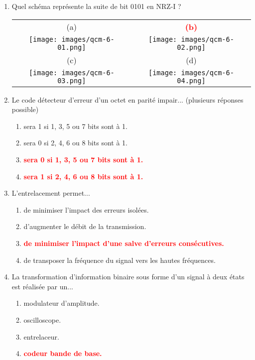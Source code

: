 \documentclass[a4paper]{article}
\begin{document}
\begin{enumerate}[label=Q\arabic*.]


\item Quel schéma représente la suite de bit 0101 en NRZ-I ?
\begin{center} \begin{tabular}{cc}
    (a) & \textcolor{red}{\textbf{(b)}} \\
    \texttt{[image: images/qcm-6-01.png]} &
    \texttt{[image: images/qcm-6-02.png]} \\
    (c) & (d) \\
    \texttt{[image: images/qcm-6-03.png]} &
    \texttt{[image: images/qcm-6-04.png]}
\end{tabular} \end{center}


\item Le code détecteur d'erreur d'un octet en parité impair... (plusieurs réponses possible)
\begin{enumerate}
    \item sera 1 si 1, 3, 5 ou 7 bits sont à 1.
    \item sera 0 si 2, 4, 6 ou 8 bits sont à 1.
    \item \textcolor{red}{\textbf{sera 0 si 1, 3, 5 ou 7 bits sont à 1.}}
    \item \textcolor{red}{\textbf{sera 1 si 2, 4, 6 ou 8 bits sont à 1.}}
\end{enumerate}


\item L'entrelacement permet...
\begin{enumerate}
    \item de minimiser l'impact des erreurs isolées.
    \item d'augmenter le débit de la transmission.
    \item \textcolor{red}{\textbf{de minimiser l'impact d'une salve d'erreurs consécutives.}}
    \item de transposer la fréquence du signal vers les hautes fréquences.
\end{enumerate}


\item La transformation d'information binaire sous forme d'un signal à deux états est réalisée par un...
\begin{enumerate}
    \item modulateur d'amplitude.
    \item oscilloscope.
    \item entrelaceur.
    \item \textcolor{red}{\textbf{codeur bande de base.}}
\end{enumerate}



\end{enumerate}
\end{document}

